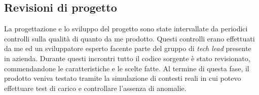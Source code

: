 \subsection{Revisioni di progetto}
\label{sub-sect:revisioni-progetto}
La progettazione e lo sviluppo del progetto sono state intervallate da periodici controlli sulla qualità di quanto da me prodotto. Questi controlli erano
effettuati da me ed un sviluppatore esperto facente parte del gruppo di \emph{tech lead} presente in azienda. Durante questi incrontri tutto il codice sorgente
è stato revisionato, commendandone le caratteristiche e le scelte fatte. Al termine di questa fase, il prodotto
veniva testato tramite la simulazione di contesti reali in cui potevo effettuare test di carico e controllare l'assenza di anomalie.

